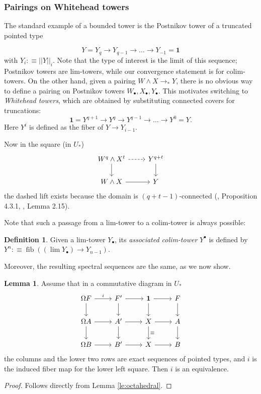 \documentclass{amsart}
\theoremstyle{definition}
\newtheorem{de}[theorem]{Definition}
\newtheorem{lem}[theorem]{Lemma}
\newcommand{\fib}{\operatorname{fib}}
\newcommand{\pto}{\to_*}
\newcommand{\sgtn}{\mathbf{1}}
\begin{document}
\subsubsection{Pairings on Whitehead towers}

The standard example of a bounded tower is the Postnikov tower of a truncated pointed type

$$Y = Y_q \to Y_{q-1} \to \ldots \to Y_{-1} = \sgtn$$
\noindent
with $Y_i :\equiv ||Y||_i$.
Note that the type of interest is the limit of this sequence; Postnikov towers are lim-towers, while our convergence statement is for {colim}-towers. On the other hand,
given a pairing $W \wedge X \pto Y$, there is no obvious way to define a pairing on Postnikov towers $W_\bullet, X_\bullet, Y_\bullet.$ This motivates switching to \textit{Whitehead towers}, which are obtained by substituting connected covers for truncations:
$$\sgtn = Y^{q+1} \to Y^{q} \to Y^{q-1} \to \ldots \to Y^{0} = Y.$$
Here $Y^i$ is defined as the fiber of $Y \to Y_{i-1}$.

Now in the square (in $U_*$)
\[\begin{tikzcd}
	{W^q \wedge X^t} & {Y^{q+t}} \\
	{W \wedge X } & Y
	\arrow[from=2-1, to=2-2]
	\arrow[from=1-1, to=2-1]
	\arrow[from=1-2, to=2-2]
	\arrow[dashed, from=1-1, to=1-2]
\end{tikzcd}\]
the dashed lift exists because the domain is $(q+t-1)$-connected (\cite{Bru}, Proposition 4.3.1, \cite{Hurewicz}, Lemma 2.15).

Note that such a passage from a lim-tower to a colim-tower is always possible:
\begin{de}
    Given a lim-tower $Y_{\bullet}$, its \textit{associated colim-tower} $Y^\bullet$ is defined by $Y^n :\equiv \fib((\lim Y_{\bullet}) \to Y_{n-1})$.
\end{de}
Moreover, the resulting spectral sequences are the same, as we now show.

\begin{lem}\label{le:fiber-grid}
    Assume that in a commutative diagram in $U_*$
\[\begin{tikzcd}
	{\Omega F} & {F'} & \sgtn & F \\
	{\Omega A} & {A'} & X & A \\
	{\Omega B} & {B'} & X & B
	\arrow["i", from=1-1, to=1-2]
	\arrow[from=1-1, to=2-1]
	\arrow[from=1-2, to=1-3]
	\arrow[from=1-2, to=2-2]
	\arrow[from=1-3, to=1-4]
	\arrow[from=1-3, to=2-3]
	\arrow[from=1-4, to=2-4]
	\arrow[from=2-1, to=2-2]
	\arrow[from=2-1, to=3-1]
	\arrow[from=2-2, to=2-3]
	\arrow[from=2-2, to=3-2]
	\arrow[from=2-3, to=2-4]
	\arrow["\equiv", from=2-3, to=3-3]
	\arrow[from=2-4, to=3-4]
	\arrow[from=3-1, to=3-2]
	\arrow[from=3-2, to=3-3]
	\arrow[from=3-3, to=3-4]
\end{tikzcd}\]
    the columns and the lower two rows are exact sequences of pointed types, and $i$ is the induced fiber map for the lower left square. Then $i$ is an equivalence.
\end{lem}
\begin{proof}
    Follows directly from Lemma \ref{le:octahedral}.
\end{proof}
\end{document}
